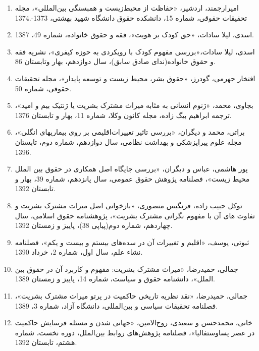 				\begin{enumerate}
	
	
\item	امیر‌ارجمند، اردشیر، «حفاظت از محیط‌زیست و همبستگی بین‌المللی»، مجله تحقیقات حقوقی، شماره 15، دانشکده حقوق دانشگاه شهید بهشتی، 1373-.1374
\item 	اسدی، لیلا سادات، «حق کودک بر هویت»، فقه و حقوق خانواده، شماره 49، 1387.
\item 	اسدی، لیلا سادات،«بررسی مفهوم کودک با رویکردی به حوزه کیفری»، نشریه فقه و حقوق خانواده(ندای صادق سابق)، سال دوازدهم، بهار وتابستان 86.
	
\item 	افتخار جهرمی، گودرز، «حقوق بشر، محیط زیست و توسعه پایدار»، مجله تحقیقات حقوقی، شماره 50.
\item 	بجاوی، محمد، «ژنوم انسانی به مثابه میراث مشترک بشریت یا ژنتیک بیم و امید»، ترجمه ابراهیم بیگ زاده، مجله کانون وکلا، شماره 11، بهار و تابستان 1376.
\item 	براتی، محمد و دیگران، «بررسی تاثیر تغییرات‌اقلیمی بر روی بیماریهای انگلی»، مجله علوم پیراپزشکی و بهداشت نظامی، سال دوازدهم، شماره دوم، تابستان 1396.
\item 	پور هاشمی، عباس و دیگران، «بررسی جایگاه اصل همکاری در حقوق بین الملل محیط زیست»، فصلنامه پژوهش حقوق عمومی، سال پانزدهم، شماره 39، بهار و تابستان 1392.
\item 	توکل حبیب زاده، فرنگیس منصوری،  «بازخوانی اصل میراث مشترک بشریت و تفاوت های آن با مفهوم نگرانی مشترک بشریت»، پژوهشنامه حقوق اسلامی، سال چهاردهم، شماره دوم(پیاپی 38)، پاییز و زمستان 1392.
\item 	ثبوتی، یوسف، «اقلیم و تغییرات آن در سده‌های بیستم و بیست و یکم»، فصلنامه نشاء علم، سال اول، شماره 2، خرداد 1390.
\item 	جمالی، حمیدرضا، «میراث مشترک بشریت: مفهوم و کاربرد آن در حقوق بین الملل»، دانشنامه حقوق و سیاست، شماره 14، پاییز و زمستان 1389.
\item 	جمالی، حمیدرضا، «نقد نظریه تاریخی حاکمیت در پرتو میراث مشترک بشریت»، فصلنامه تحقیقات سیاسی و بین‌المللی، دانشگاه آزاد، شماره 3، 1389.

\item خانی، محمدحسن و سعیدی، روح‌الامین، «جهانی شدن و مسئله فرسایش حاکمیت در عصر پساوستفالیا»، فصلنامه پژوهش‌های روابط بین‌الملل، دوره نخست، شماره هشتم، تابستان 1392.


\end{enumerate}
